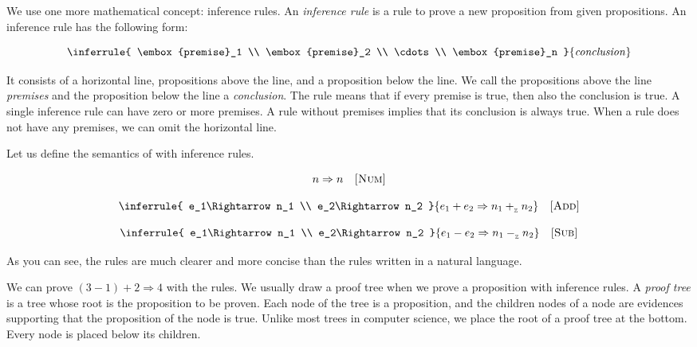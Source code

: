 
\vspace{-1em}


\vspace{-1em}


We use one more mathematical concept: inference rules. An \textit{inference
rule} is a rule to prove a new proposition from given
propositions. An inference rule has the following form:

\[
  \inferrule
  { \embox{premise}_1 \\ \embox{premise}_2 \\ \cdots \\ \embox{premise}_n }
  { \embox{conclusion} }
\]

It consists of a horizontal line, propositions above the line, and a proposition
below the line. We call the propositions above the line
\textit{premises} and the proposition below the line a
\textit{conclusion}. The rule means that if every premise is
true, then also the conclusion is true. A single inference rule can have zero or
more premises. A rule without premises implies that its conclusion is always
true. When a rule does not have any premises, we can omit the horizontal line.

Let us define the semantics of \Lang with inference rules.

\[
  n\Rightarrow n
  \quad\textsc{[Num]}
\]

\[
  \inferrule
  { e_1\Rightarrow n_1 \\ e_2\Rightarrow n_2 }
  { e_1+e_2\Rightarrow n_1\iadd n_2 }
  \quad\textsc{[Add]}
\]

\[
  \inferrule
  { e_1\Rightarrow n_1 \\ e_2\Rightarrow n_2 }
  { e_1-e_2\Rightarrow n_1\isub n_2 }
  \quad\textsc{[Sub]}
\]

As you can see, the rules are much clearer and more concise than the rules
written in a natural language.

We can prove $(3-1)+2\Rightarrow4$ with the rules. We usually draw a proof tree
when we prove a proposition with inference rules. A \textit{proof
tree} is a tree whose root is the proposition to be proven.
Each node of the tree is a proposition, and the children nodes of a node are
evidences supporting that the proposition of the node is true. Unlike most trees in
computer science, we place the root of a proof tree at the bottom. Every node is
placed below its children.

